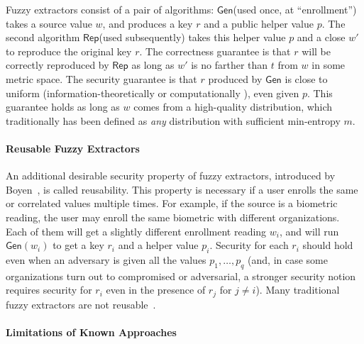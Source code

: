 \documentclass[11pt]{article}
\newcommand{\class}[1]{{\ensuremath{\mathsf{#1}}}}
\newcommand{\gen}{\ensuremath{\class{Gen}}\xspace}
\newcommand{\rep}{\ensuremath{\class{Rep}}\xspace}
\newcommand{\authnote}[2]{{\textcolor{red}{\textsf{#1 notes: }\textcolor{blue}{ #2}}\marginpar{\textcolor{red}{\textbf{!!!!!}}}}}
\newcommand{\authnote}[2]{}
\newcommand{\onote}[1]{{\authnote{Omer}{#1}}}
\begin{document}
Fuzzy extractors consist of a pair of algorithms: \gen (used once, at ``enrollment'') takes a source value $w$, and produces a key $r$ and a public helper value $p$.  The second algorithm \rep (used subsequently) takes this helper value $p$ and a close $w'$ to reproduce the original key $r$.
The correctness guarantee is that $r$ will be correctly reproduced by \rep as long as $w'$ is no farther than $t$ from $w$ in some metric space.%
 The security guarantee is that $r$ produced by \gen is close to uniform (information-theoretically \cite{DBLP:journals/siamcomp/DodisORS08} or computationally \cite{fuller2013computational}), even given $p$. This guarantee holds as long as $w$ comes from a high-quality distribution, which
traditionally has been defined as \emph{any} distribution with sufficient min-entropy $m$.

\paragraph{Reusable Fuzzy Extractors}
An additional desirable security property of fuzzy extractors, introduced by Boyen~\cite{Boyen2004}, is called reusability. This property is necessary if a user enrolls the same or correlated values multiple times. For example, if the source is a biometric reading, the user may enroll the same biometric with different organizations.  Each of them will get a slightly different enrollment reading $w_i$, and will run $\gen(w_i)$ to get a key $r_i$ and a helper value $p_i$. Security for each $r_i$ should hold even when an adversary is given all the values $p_1, \dots, p_q$ (and, in case some organizations turn out to compromised or adversarial, a stronger security notion requires security for $r_i$ even in the presence of $r_j$ for $j\neq i$).  Many traditional fuzzy extractors are not reusable~\cite{Boyen2004,simoens2009privacy,blanton2012non,blanton2013analysis}.


\paragraph{Limitations of Known Approaches}
\end{document}
